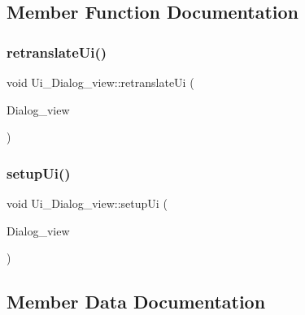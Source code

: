 \subsection{Member Function Documentation}
\hypertarget{class_ui___dialog__view_ae834a6e58c7545bcef4d5f0270b331a8}{}\label{class_ui___dialog__view_ae834a6e58c7545bcef4d5f0270b331a8} 
\subsubsection{\texorpdfstring{retranslate\+Ui()}{retranslateUi()}}
{\footnotesize\ttfamily void Ui\+\_\+\+Dialog\+\_\+view\+::retranslate\+Ui (\begin{DoxyParamCaption}\item[{Q\+Dialog $\ast$}]{Dialog\+\_\+view }\end{DoxyParamCaption})\hspace{0.3cm}{\ttfamily [inline]}}

\hypertarget{class_ui___dialog__view_afb94a51d635b2bf69733fd2a4ea41952}{}\label{class_ui___dialog__view_afb94a51d635b2bf69733fd2a4ea41952} 
\subsubsection{\texorpdfstring{setup\+Ui()}{setupUi()}}
{\footnotesize\ttfamily void Ui\+\_\+\+Dialog\+\_\+view\+::setup\+Ui (\begin{DoxyParamCaption}\item[{Q\+Dialog $\ast$}]{Dialog\+\_\+view }\end{DoxyParamCaption})\hspace{0.3cm}{\ttfamily [inline]}}



\subsection{Member Data Documentation}
\hypertarget{class_ui___dialog__view_a21a8c87fb64b14eee9315ef19a3a3bb3}{}\label{class_ui___dialog__view_a21a8c87fb64b14eee9315ef19a3a3bb3} 
